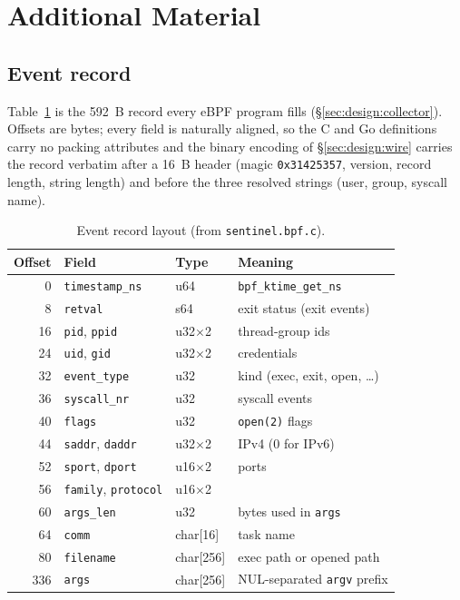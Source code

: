 \section{Additional Material}
\label{sec:appendix}

\subsection{Event record}
\label{sec:appendix:record}
Table~\ref{tab:record} is the \SI{592}{B} record every eBPF program fills
(\S\ref{sec:design:collector}). Offsets are bytes; every field is naturally
aligned, so the C and Go definitions carry no packing attributes and the
binary encoding of \S\ref{sec:design:wire} carries the record verbatim
after a \SI{16}{B} header (magic \texttt{0x31425357}, version, record
length, string length) and before the three resolved strings (user, group,
syscall name).

\begin{table}[h]
\caption{Event record layout (from \texttt{sentinel.bpf.c}).}
\label{tab:record}
\centering\footnotesize
\begin{tabular}{@{}rlll@{}}
\toprule
Offset & Field & Type & Meaning \\
\midrule
0 & \texttt{timestamp\_ns} & u64 & \texttt{bpf\_ktime\_get\_ns} \\
8 & \texttt{retval} & s64 & exit status (exit events) \\
16 & \texttt{pid}, \texttt{ppid} & u32$\times$2 & thread-group ids \\
24 & \texttt{uid}, \texttt{gid} & u32$\times$2 & credentials \\
32 & \texttt{event\_type} & u32 & kind (exec, exit, open, \ldots) \\
36 & \texttt{syscall\_nr} & u32 & syscall events \\
40 & \texttt{flags} & u32 & \texttt{open(2)} flags \\
44 & \texttt{saddr}, \texttt{daddr} & u32$\times$2 & IPv4 (0 for IPv6) \\
52 & \texttt{sport}, \texttt{dport} & u16$\times$2 & ports \\
56 & \texttt{family}, \texttt{protocol} & u16$\times$2 & \\
60 & \texttt{args\_len} & u32 & bytes used in \texttt{args} \\
64 & \texttt{comm} & char[16] & task name \\
80 & \texttt{filename} & char[256] & exec path or opened path \\
336 & \texttt{args} & char[256] & NUL-separated \texttt{argv} prefix \\
\bottomrule
\end{tabular}
\end{table}

